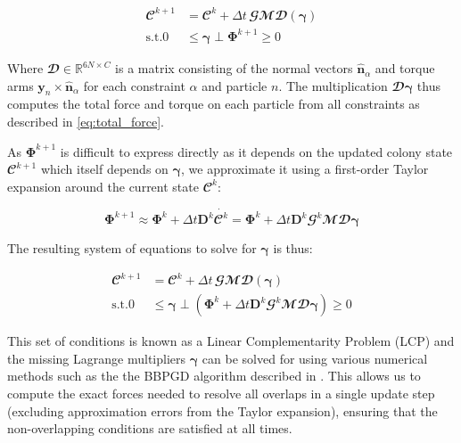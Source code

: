 \documentclass[conference]{IEEEtran}
\begin{document}
$$
    \begin{align}
        \mathbfcal{C}^{k+1} & = \mathbfcal{C}^k + \Delta t \, \mathbfcal{G}\mathbfcal{M} \mathbfcal{D}(\mathbf{\gamma}) \\
        \text{s.t.} 0       & \leq \mathbf{\gamma} \perp \mathbf{\Phi}^{k+1} \geq 0
    \end{align}
$$

Where $\mathbfcal{D} \in \mathbb{R}^{6N \times C}$ is a matrix consisting of the normal vectors $\hat{\mathbf{n}}_\alpha$ and torque arms $\mathbf{y}_n \times \hat{\mathbf{n}}_\alpha$ for each constraint $\alpha$ and particle $n$. The multiplication $\mathbfcal{D}\mathbf{\gamma}$ thus computes the total force and torque on each particle from all constraints as described in \autoref{eq:total_force}.


As $\mathbf{\Phi}^{k+1}$ is difficult to express directly as it depends on the updated colony state $\mathbfcal{C}^{k+1}$ which itself depends on $\mathbf{\gamma}$, we approximate it using a first-order Taylor expansion around the current state $\mathbfcal{C}^k$:

$$
    \mathbf{\Phi}^{k+1} \approx \mathbf{\Phi}^k + \Delta t \mathbf{D}^k \dot{\mathbfcal{C}^k} = \mathbf{\Phi}^k + \Delta t \mathbf{D}^k \mathbfcal{G}^k \mathbfcal{M} \mathbfcal{D} \mathbf{\gamma}
$$

The resulting system of equations to solve for $\mathbf{\gamma}$ is thus:

$$
    \begin{align}
        \mathbfcal{C}^{k+1} & = \mathbfcal{C}^k + \Delta t \, \mathbfcal{G}\mathbfcal{M} \mathbfcal{D}(\mathbf{\gamma})                                                            \\
        \text{s.t.} 0       & \leq \mathbf{\gamma} \perp \left( \mathbf{\Phi}^k + \Delta t \mathbf{D}^k \mathbfcal{G}^k \mathbfcal{M} \mathbfcal{D} \mathbf{\gamma} \right) \geq 0
    \end{align}
$$


This set of conditions is known as a Linear Complementarity Problem (LCP) and the missing Lagrange multipliers $\mathbf{\gamma}$ can be solved for using various numerical methods such as the the BBPGD algorithm described in \cite{Weady2024}. This allows us to compute the exact forces needed to resolve all overlaps in a single update step (excluding approximation errors from the Taylor expansion), ensuring that the non-overlapping conditions are satisfied at all times.
\end{document}
